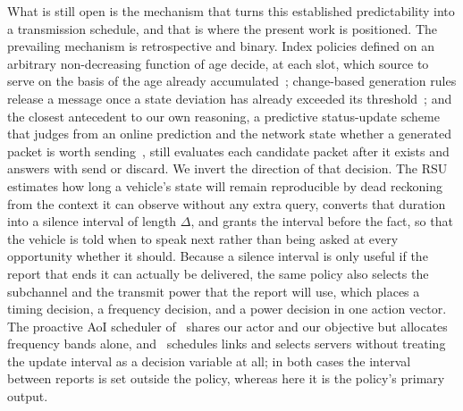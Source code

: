 \documentclass[journal]{IEEEtran}
\begin{document}
What is still open is the mechanism that turns this established predictability into a transmission schedule, and that is where the present work is positioned. The prevailing mechanism is retrospective and binary. Index policies defined on an arbitrary non-decreasing function of age decide, at each slot, which source to serve on the basis of the age already accumulated~\cite{tripathi2024}; change-based generation rules release a message once a state deviation has already exceeded its threshold~\cite{maksimovski2026}; and the closest antecedent to our own reasoning, a predictive status-update scheme that judges from an online prediction and the network state whether a generated packet is worth sending~\cite{jiang2021}, still evaluates each candidate packet after it exists and answers with send or discard. We invert the direction of that decision. The RSU estimates how long a vehicle's state will remain reproducible by dead reckoning from the context it can observe without any extra query, converts that duration into a silence interval of length $\Delta$, and grants the interval before the fact, so that the vehicle is told when to speak next rather than being asked at every opportunity whether it should. Because a silence interval is only useful if the report that ends it can actually be delivered, the same policy also selects the subchannel and the transmit power that the report will use, which places a timing decision, a frequency decision, and a power decision in one action vector. The proactive AoI scheduler of~\cite{chen2020} shares our actor and our objective but allocates frequency bands alone, and~\cite{xie2025} schedules links and selects servers without treating the update interval as a decision variable at all; in both cases the interval between reports is set outside the policy, whereas here it is the policy's primary output.
\end{document}
